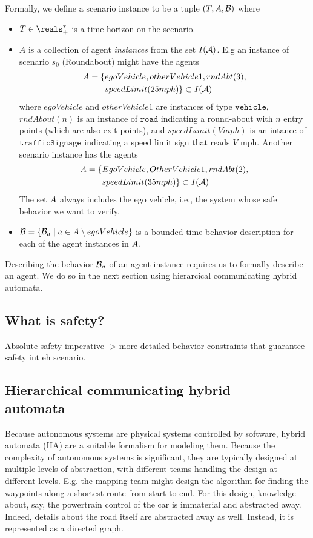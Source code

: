 Formally, we define a scenario instance to be a tuple $(T, A,\mathcal{B})$ where
\begin{itemize}
\item $T \in \preals$ is a time horizon on the scenario.
%
\item $A$ is a collection of agent \emph{instances} from the set $I(\mathcal{A})$.
E.g an instance of scenario $s_0$ (Roundabout) might have the agents 
\begin{eqnarray*}
A = \{&egoVehicle, otherVehicle1, rndAbt(3), \\ 
& speedLimit(25mph)\} \subset I(\mathcal{A})
\end{eqnarray*}
where $egoVehicle$ and $otherVehicle1$ are instances of type $\texttt{vehicle}$, 
$rndAbout(n)$ is an instance of $\texttt{road}$ indicating a round-about with $n$ entry points (which are also exit points),
and $speedLimit(Vmph)$ is an intance of $\texttt{trafficSignage}$ indicating a speed limit sign that reads $V$ mph.
Another scenario instance has the agents
\begin{eqnarray*}
A = \{&EgoVehicle, OtherVehicle1, rndAbt(2), \\ 
& speedLimit(35mph)\} \subset I(\mathcal{A})
\end{eqnarray*}
The set $A$ always includes the ego vehicle, i.e., the system whose safe behavior we want to verify.
%
\item $\mathcal{B} = \{\mathcal{B}_a \;|\; a \in A \setminus egoVehicle\}$ is a bounded-time behavior description for each of the agent instances in $A$.
\end{itemize}

Describing the behavior $\mathcal{B}_a$ of an agent instance requires us to formally describe an agent. We do so in the next section using hierarcical communicating hybrid automata.

\subsection{What is safety?}
\label{safety}
Absolute safety imperative -> more detailed behavior constraints that guarantee safety int eh scenario.

\subsection{Hierarchical communicating hybrid \\automata}
\label{HCHA}
Because autonomous systems are physical systems controlled by software, hybrid automata (HA) are a suitable formalism for modeling them.
Because the complexity of autonomous systems is significant, they are typically designed at multiple levels of abstraction, 
with different teams handling the design at different levels.
E.g. the mapping team might design the algorithm for finding the waypoints along a shortest route from start to end.
For this design, knowledge about, say, the powertrain control of the car is immaterial and abstracted away.
Indeed, details about the road itself are abstracted away as well.
Instead, it is represented as a directed graph.

